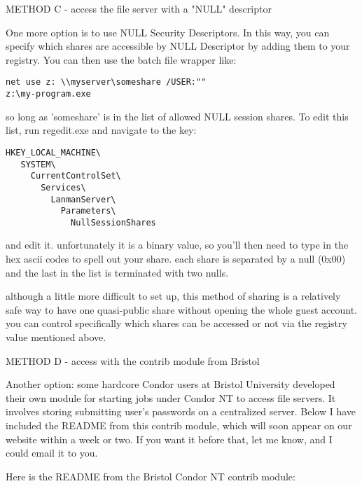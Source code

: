 METHOD C - access the file server with a "NULL" descriptor

One more option is to use NULL Security Descriptors.  In this way, you
can specify which shares are accessible by NULL Descriptor by adding
them to your registry.  You can then use the batch file wrapper like:

\begin{verbatim}
net use z: \\myserver\someshare /USER:""
z:\my-program.exe
\end{verbatim}

so long as 'someshare' is in the list of allowed NULL session shares.  To
edit this list, run regedit.exe and navigate to the key:

\begin{verbatim}
HKEY_LOCAL_MACHINE\
   SYSTEM\
     CurrentControlSet\
       Services\
         LanmanServer\
           Parameters\
             NullSessionShares
\end{verbatim}

and edit it.  unfortunately it is a binary value, so you'll then need to
type in the hex ascii codes to spell out your share.  each share is
separated by a null (0x00) and the last in the list is terminated with
two nulls.

although a little more difficult to set up, this method of sharing is a
relatively safe way to have one quasi-public share without opening the
whole guest account.  you can control specifically which shares can be 
accessed or not via the registry value mentioned above.


METHOD D -  access with the contrib module from Bristol

Another option: some hardcore Condor users at Bristol University developed 
their own module for starting jobs under Condor NT to access file 
servers.  It involves storing submitting user's passwords on a centralized 
server.  Below I have included the README from this contrib module, which 
will soon appear on our website within a week or two.  If you want it 
before that, let me know, and I could email it to you.

Here is the README from the Bristol Condor NT contrib module:

